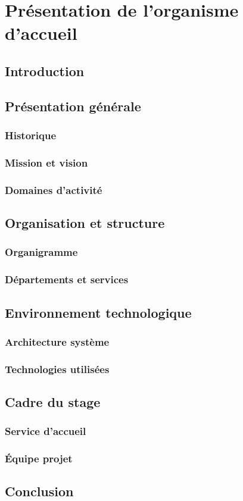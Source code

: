 \chapter{Présentation de l'organisme d'accueil}

\section{Introduction}

\section{Présentation générale}

\subsection{Historique}

\subsection{Mission et vision}

\subsection{Domaines d'activité}

\section{Organisation et structure}

\subsection{Organigramme}

\subsection{Départements et services}

\section{Environnement technologique}

\subsection{Architecture système}

\subsection{Technologies utilisées}

\section{Cadre du stage}

\subsection{Service d'accueil}

\subsection{Équipe projet}

\section{Conclusion}